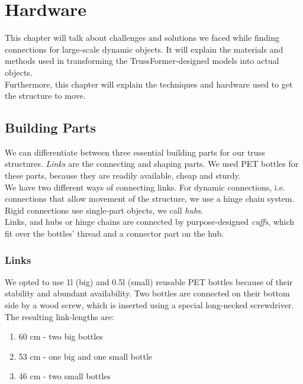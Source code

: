 \chapter{Hardware}\label{ch:hardware}
This chapter will talk about challenges and solutions we faced while finding connections for large-scale dynamic objects. It will explain the materials and methods used in transforming the TrussFormer-designed models into actual objects.\\
Furthermore, this chapter will explain the techniques and hardware used to get the structure to move.

\section{Building Parts}
We can differentiate between three essential building parts for our truss structures. \textit{Links} are the connecting and shaping parts. We used PET bottles for these parts, because they are readily available, cheap and sturdy.\\
We have two different ways of connecting links. For dynamic connections, i.e. connections that allow movement of the structure, we use a hinge chain system. Rigid connections use single-part objects, we call \textit{hubs}.\\
Links, and hubs or hinge chains are connected by purpose-designed \textit{cuffs}, which fit over the bottles' thread and a connector part on the hub.

\subsection{Links}
We opted to use 1l (big) and 0.5l (small) reusable PET bottles because of their stability and abundant availability. Two bottles are connected on their bottom side by a wood screw, which is inserted using a special long-necked screwdriver. The resulting link-lengths are:
\begin{enumerate}
\item 60 cm - two big bottles
\item 53 cm - one big and one small bottle
\item 46 cm - two small bottles
\end{enumerate}

